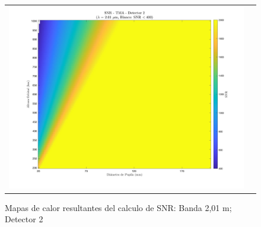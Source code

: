 \begin{landscape}
\begin{figure}[p]
\begin{tabular}{cc}
\includegraphics[width=0.48\linewidth]{4.Payload/SNR/SNR_Lambda2_Detector2_Telescopio4_heatmap.jpg} \\
\end{tabular}
\caption{Mapas de calor resultantes del calculo de SNR: Banda 2,01 \textmu m; Detector 2}
\end{figure}
\end{landscape}


